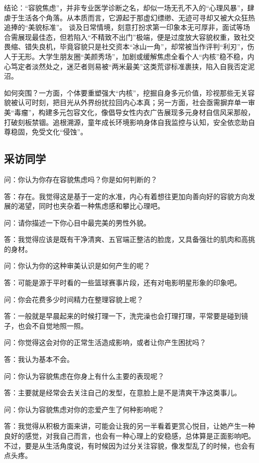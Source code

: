 结论：``容貌焦虑''，并非专业医学诊断之名，却似一场无孔不入的``心理风暴''，肆虐于生活各个角落。从本质而言，它源起于那虚幻缥缈、无迹可寻却又被大众狂热追捧的``美貌标准''。
谈及日常情境，刻意打扮求第一印象本无可厚非，面试等场合需展现最佳态，但若陷入``不精致不出门''极端，便是过度放大容貌权重，致社交畏缩、错失良机，毕竟容貌只是社交资本``冰山一角''，却常被当作评判``利刃''，伤人于无形。大学生朋友圈``美颜秀场''，加剧或缓解焦虑全看个人``内核''稳不稳，内心笃定者淡然处之，迷茫者则易被``两米最美''这类荒谬标准裹挟，陷入自我否定泥沼。

如何突围？一方面，个体要重塑强大``内核''，挖掘自身多元价值，珍视那些无关容貌被认可时刻，把目光从外界纷扰拉回内心本真；另一方面，社会亟需摒弃单一审美``毒瘤''，构建多元包容文化，像倡导女性内衣广告展现多元身材自信风采那般，打破刻板禁锢。追根溯源，童年成长环境影响身体自我监控与认知，安全依恋助自尊稳固，免受文化``侵蚀''。

\subsection{采访同学}
问：你认为你存在容貌焦虑吗？你是如何判断的？

答：存在。我觉得这是基于一定的水准，内心有着想往更加向善向好的容貌方向发展的渴望，同时也夹杂着一种焦虑感和攀比心理吧。

问：请你描述一下你心目中最完美的男性外貌。

答：我觉得应该是既有干净清爽、五官端正整洁的脸庞，又具备强壮的肌肉和高挑的身材。

问：你认为你的这种审美认识是如何产生的呢？

答：可能是源于平时看的一些篮球赛事片段，还有对电影明星形象的印象吧。

问：你会花费多少时间精力在整理容貌上呢？

答：一般就是早晨起来的时候打理一下，洗完澡也会打理打理，平常要是碰到镜子，也会不自觉地照一照。

问：你觉得这会对你的正常生活造成影响，或者让你产生困扰吗？

答：我认为基本不会。

问：你认为容貌焦虑在你身上有什么主要的表现呢？

答：主要就是经常会去关注自己的发型，在意脸上是不是清爽干净这类事儿。

问：你认为容貌焦虑对你的恋爱产生了何种影响呢？

答：我觉得从积极方面来讲，可能会让我的另一半看着更赏心悦目，让她产生一种良好的感觉，对我自己而言，也会有一种心理上的安稳感，总体算是正面影响吧。不过，要是从生活角度说，有时候因为过分关注容貌，像发型乱了的时候，也会有点头疼。


